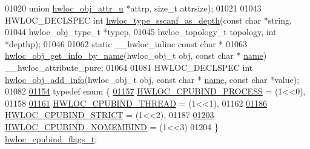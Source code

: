 \begin{DoxyCode}
01020                                      \textcolor{keyword}{union} \hyperlink{a00242}{hwloc\_obj\_attr\_u} *attrp, \textcolor{keywordtype}{size\_t} attrsize);
01021 
01043 HWLOC\_DECLSPEC \textcolor{keywordtype}{int} \hyperlink{a00188_ga52c63cd7203e55b804c1314affc9bd12}{hwloc\_type\_sscanf\_as\_depth}(\textcolor{keyword}{const} \textcolor{keywordtype}{char} *\textcolor{keywordtype}{string},
01044                                               hwloc\_obj\_type\_t *typep,
01045                                               hwloc\_topology\_t topology, \textcolor{keywordtype}{int} *depthp);
01046 
01062 \textcolor{keyword}{static} \_\_hwloc\_inline \textcolor{keyword}{const} \textcolor{keywordtype}{char} *
01063 \hyperlink{a00189_gab358661a92bb27d8542b255cc9f6f25e}{hwloc\_obj\_get\_info\_by\_name}(hwloc\_obj\_t obj, \textcolor{keyword}{const} \textcolor{keywordtype}{char} *
      \hyperlink{a00238_abb709ec38f2970677e4e57d1d30be96d}{name}) \_\_hwloc\_attribute\_pure;
01064 
01081 HWLOC\_DECLSPEC \textcolor{keywordtype}{int} \hyperlink{a00189_gace7654bb8a9002caae1a4b8a59e7452e}{hwloc\_obj\_add\_info}(hwloc\_obj\_t obj, \textcolor{keyword}{const} \textcolor{keywordtype}{char} *
      \hyperlink{a00238_abb709ec38f2970677e4e57d1d30be96d}{name}, \textcolor{keyword}{const} \textcolor{keywordtype}{char} *value);
01082 
\hyperlink{a00190_ga217dc8d373f8958cc93c154ebce1c71c}{01154} \textcolor{keyword}{typedef} \textcolor{keyword}{enum} \{
\hyperlink{a00190_gga217dc8d373f8958cc93c154ebce1c71ca2e0dd0128dac6b03408c7dd170477fdc}{01157}   \hyperlink{a00190_gga217dc8d373f8958cc93c154ebce1c71ca2e0dd0128dac6b03408c7dd170477fdc}{HWLOC\_CPUBIND\_PROCESS} = (1<<0),
01158 
\hyperlink{a00190_gga217dc8d373f8958cc93c154ebce1c71caf1b6bbad00d7b1017b918e3719f4d421}{01161}   \hyperlink{a00190_gga217dc8d373f8958cc93c154ebce1c71caf1b6bbad00d7b1017b918e3719f4d421}{HWLOC\_CPUBIND\_THREAD} = (1<<1),
01162 
\hyperlink{a00190_gga217dc8d373f8958cc93c154ebce1c71ca679a7e0f0c7ee06b123565f90d98e7fa}{01186}   \hyperlink{a00190_gga217dc8d373f8958cc93c154ebce1c71ca679a7e0f0c7ee06b123565f90d98e7fa}{HWLOC\_CPUBIND\_STRICT} = (1<<2),
01187 
\hyperlink{a00190_gga217dc8d373f8958cc93c154ebce1c71ca41ce440443cc3087caed95ab60edcad6}{01203}   \hyperlink{a00190_gga217dc8d373f8958cc93c154ebce1c71ca41ce440443cc3087caed95ab60edcad6}{HWLOC\_CPUBIND\_NOMEMBIND} = (1<<3)
01204 \} \hyperlink{a00190_ga217dc8d373f8958cc93c154ebce1c71c}{hwloc\_cpubind\_flags\_t};

\end{DoxyCode}
